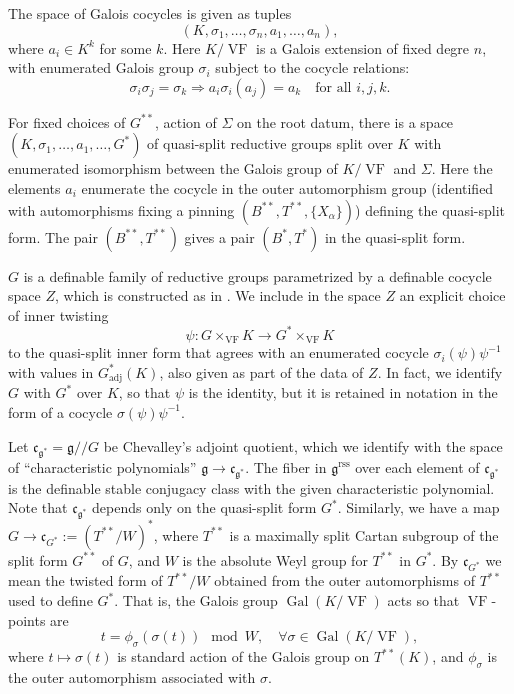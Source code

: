 \documentclass[12pt]{amsart}
\newcommand{\op}[1]{\operatorname{#1}}
\def\VF{{\op{VF}}}
\newcommand{\fg}{\mathfrak{g}}
\newcommand{\fc}{\mathfrak{c}}
\newcommand{\reg}{\mathrm{rss}}
\theoremstyle{plain}
\theoremstyle{definition}
\begin{document}
The space of Galois cocycles is given as tuples
\[
(K,\sigma_1,\ldots,\sigma_n,a_1,\ldots,a_n),
\]
where $a_i \in K^k$ for some $k$.  Here $K/\VF$ is a Galois extension of
fixed degre $n$, with enumerated Galois group $\sigma_i$ subject to
the cocycle relations:
\[
\sigma_i \sigma_j 
  = \sigma_k \Longrightarrow a_i \sigma_i(a_j) 
  = a_k\quad\text{for all } i,j,k.
\]

For fixed choices of $G^{**}$, action of $\Sigma$ on the root datum,
there is a space $(K,\sigma_1,\ldots,a_1,\ldots,G^*)$ of
quasi-split reductive groups split over $K$ with enumerated
isomorphism between the Galois group of $K/\VF$ and $\Sigma$.  Here
the elements $a_i$ enumerate the cocycle in the outer
automorphism group (identified with automorphisms fixing a pinning
$(B^{**},T^{**},\{X_\alpha\})$) defining the quasi-split form.  The
pair $(B^{**},T^{**})$ gives a pair $(B^*,T^*)$ in the quasi-split
form.

$G$ is a definable family of reductive groups parametrized by a
definable cocycle space $Z$, which is constructed as in \cite{CGH}.
We include in the space $Z$ an explicit choice of inner twisting
\[
\psi:G
\times_\VF K \to G^*\times_\VF K
\] to the quasi-split inner form that agrees with an enumerated
cocycle $\sigma_i(\psi) \psi^{-1}$ with values in $G^*_{\op{adj}}(K)$, also
given as part of the data of $Z$.  In fact, we identify $G$ with $G^*$
over $K$, so that $\psi$ is the identity, but it is retained in
notation in the form of a cocycle $\sigma(\psi)\psi^{-1}$.  

Let $\fc_{\fg^{*}} = \fg/\!/G$ be Chevalley's adjoint quotient, which
we identify with the space of ``characteristic polynomials'' $\fg\to
\fc_{\fg^{*}}$.  The fiber in $\fg^\reg$ over each element of
$\fc_{\fg^{*}}$ is the definable stable conjugacy class with the given
characteristic polynomial.  Note that $\fc_{\fg^{*}}$ depends only on
the quasi-split form $G^*$. Similarly, we have a map $G\to \fc_{G^*}:=
(T^{**}/W)^*$, where $T^{**}$ is a maximally split Cartan subgroup of
the split form $G^{**}$ of $G$, and $W$ is the absolute Weyl group for
$T^{**}$ in $G^*$.  By $\fc_{G^*}$ we mean the twisted form of
$T^{**}/W$ obtained from the outer automorphisms of $T^{**}$ used to
define $G^*$.  That is, the Galois group $\op{Gal}(K/\VF)$ acts so
that $\VF$-points are
\[
t =  \phi_\sigma(\sigma(t))\mod W, \quad\forall \sigma\in\op{Gal}(K/\VF),
\]
where $t\mapsto \sigma(t)$ is standard action of the Galois
group on $T^{**}(K)$, and $\phi_\sigma$ is the outer automorphism
associated with $\sigma$.
\end{document}
